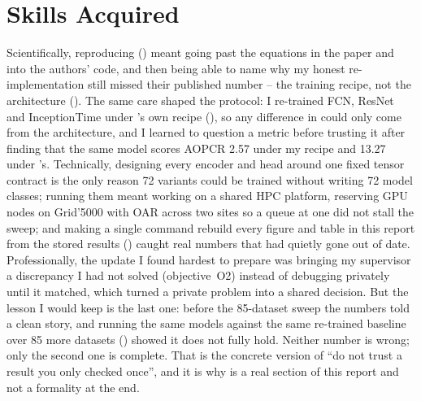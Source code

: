 %

\section{Skills Acquired}
\label{sec:skills}

Scientifically, reproducing \millet{} () meant going past the equations in the
paper and into the authors' code, and then being able to name why my honest re-implementation still
missed their published number -- the training recipe, not the architecture
(). The same care shaped the protocol: I re-trained FCN, ResNet and
InceptionTime under \seanet{}'s own recipe (), so any difference in
 could only come from the architecture, and I learned to question a metric before
trusting it after finding that the same model scores AOPCR 2.57 under my recipe and 13.27 under
\millet{}'s. Technically, designing every encoder and head around one fixed tensor contract is the
only reason 72 variants could be trained without writing 72 model classes; running them meant
working on a shared HPC platform, reserving GPU nodes on Grid'5000 with OAR across two sites so a
queue at one did not stall the sweep; and making a single command rebuild every figure and table in
this report from the stored results () caught real numbers that had quietly gone
out of date. Professionally, the update I found hardest to prepare was bringing my supervisor a
discrepancy I had not solved (objective~O2) instead of debugging privately until it matched, which
turned a private problem into a shared decision. But the lesson I would keep is the last one: before
the 85-dataset \ucr{} sweep the \webtraffic{} numbers told a clean story, and running the same models
against the same re-trained baseline over 85 more datasets () showed it does not
fully hold. Neither number is wrong; only the second one is complete. That is the concrete version
of ``do not trust a result you only checked once'', and it is why  is a
real section of this report and not a formality at the end.
